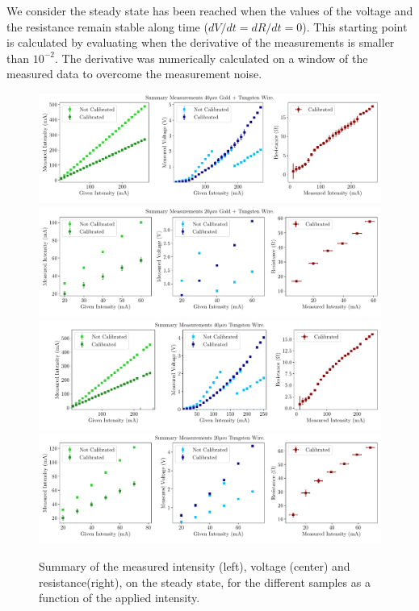 We consider the steady state has been reached when the values of the voltage and the resistance remain stable along time ($dV/dt = dR/dt = 0 $).  This starting point is calculated by evaluating when the derivative of the measurements is smaller than $10^{-2}$. The derivative was numerically calculated on a window of the measured data to overcome the measurement noise. 

\begin{figure}[h!]
    \centering
    \includegraphics[width=1.0\columnwidth]{Figure_MeasuredValues_IVR/40AuW.pdf}
    \includegraphics[width=1.0\columnwidth]{Figure_MeasuredValues_IVR/20AuW.pdf}
    \includegraphics[width=1.0\columnwidth]{Figure_MeasuredValues_IVR/40W.pdf}
    \includegraphics[width=1.0\columnwidth]{Figure_MeasuredValues_IVR/20W.pdf}
    \caption{Summary of the measured intensity (left), voltage (center) and resistance(right), on the steady state, for the different samples as a function of the applied intensity. }
    \label{fig:SummarySteadyState}
\end{figure}

